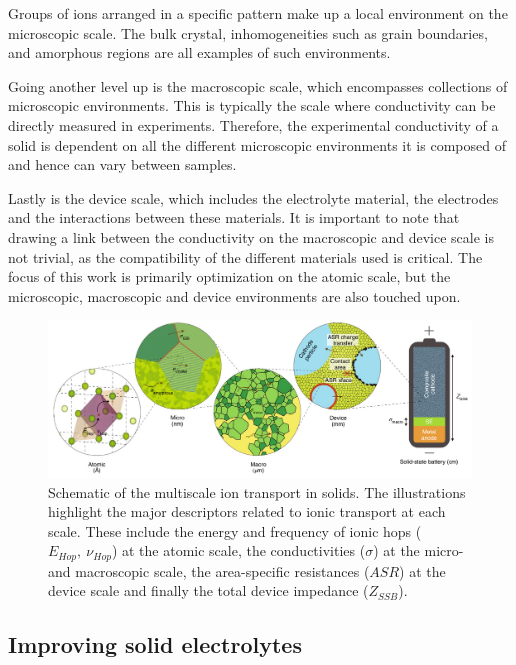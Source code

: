 \documentclass[12pt]{report}
\begin{document}
Groups of ions arranged in a specific pattern make up a local environment on the microscopic scale.
The bulk crystal, inhomogeneities such as grain boundaries, and amorphous regions are all examples of such environments. 

Going another level up is the macroscopic scale, which encompasses collections of microscopic environments.
This is typically the scale where conductivity can be directly measured in experiments.
Therefore, the experimental conductivity of a solid is dependent on all the different microscopic environments it is composed of and hence can vary between samples.

Lastly is the device scale, which includes the electrolyte material, the electrodes and the interactions between these materials.
It is important to note that drawing a link between the conductivity on the macroscopic and device scale is not trivial, as the compatibility of the different materials used is critical.\cite{famprikis2019} 
The focus of this work is primarily optimization on the atomic scale, but the microscopic, macroscopic and device environments are also touched upon. 

\begin{figure}[!ht]
\centering
\includegraphics[width=\textwidth]{./figures/scales.png}
\caption{Schematic of the multiscale ion transport in solids. The illustrations highlight the major descriptors related to ionic transport at each scale. These include the energy and frequency of ionic hops ($E_{Hop}, \ \nu_{Hop}$) at the atomic scale, the conductivities ($\sigma$) at the micro- and macroscopic scale, the area-specific resistances ($ASR$) at the device scale and finally the total device impedance ($Z_{SSB}$).  \cite{famprikis2019}}
\label{scales}
\end{figure}

\subsection{Improving solid electrolytes}
\end{document}
